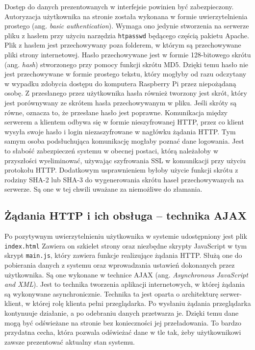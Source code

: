 \documentclass[a4paper,11pt,twoside]{article}
\begin{document}
Dostęp do danych prezentowanych w interfejsie powinien być zabezpieczony. Autoryzacja użytkownika na stronie została wykonana w formie uwierzytelnienia prostego (ang. \textit{basic authentication}). Wymaga ono jedynie stworzenia na serwerze pliku z hasłem przy użyciu narzędzia \texttt{htpasswd} będącego częścią pakietu Apache. Plik z hasłem jest przechowywany poza folderem, w którym są przechowywane pliki strony internetowej. Hasło przechowywane jest w formie 128-bitowego skrótu (ang. \textit{hash}) stworzonego przy pomocy funkcji skrótu MD5.\cite{apache-password} Dzięki temu hasło nie jest przechowywane w formie prostego tekstu, który mogłyby od razu odczytany w wypadku zdobycia dostępu do komputera Raspberry Pi przez niepożądaną osobę. Z przesłanego przez użytkownika hasła również tworzony jest skrót, który jest porównywany ze skrótem hasła przechowywanym w pliku. Jeśli skróty są równe, oznacza to, że przesłane hasło jest poprawne. Komunikacja między serwerem a klientem odbywa się w formie nieszyfrowanej HTTP, przez co klient wysyła swoje hasło i login niezaszyfrowane w nagłówku żądania HTTP.\cite{http-auth} Tym samym osoba podsłuchująca komunikację mogłaby poznać dane logowania. Jest to słabość zabezpieczeń systemu w obecnej postaci, którą należałoby w przyszłości wyeliminować, używając szyfrowania SSL w komunikacji przy użyciu protokołu HTTP. Dodatkowym usprawnieniem byłoby użycie funkcji skrótu z rodziny SHA-2 lub SHA-3 do wygenerowania skrótu haseł przechowywanych na serwerze. Są one w tej chwili uważane za niemożliwe do złamania.
 
\subsection{Żądania HTTP i ich obsługa -- technika AJAX}
Po pozytywnym uwierzytelnieniu użytkownika w systemie udostępniony jest plik \texttt{index.html} Zawiera on szkielet strony oraz niezbędne skrypty JavaScript w tym skrypt \texttt{main.js}, który zawiera funkcje realizujące żądania HTTP. Służą one do pobierania danych z systemu oraz wprowadzania ustawień dokonanych przez użytkownika. Są one wykonane w technice AJAX (ang. \textit{Asynchronous JavaScript and XML}). Jest to technika tworzenia aplikacji internetowych, w której żądania są wykonywane asynchronicznie. Technika ta jest oparta o architekturę serwer-klient, w której rolę klienta pełni przeglądarka. Po wysłaniu żądania przeglądarka kontynuuje działanie, a po odebraniu danych przetwarza je. Dzięki temu dane mogą być odświeżane na stronie bez konieczności jej przeładowania. To bardzo przydatna cecha, która pozwala odświeżać dane w tle tak, żeby użytkownikowi zawsze prezentować aktualny stan systemu.
\end{document}
